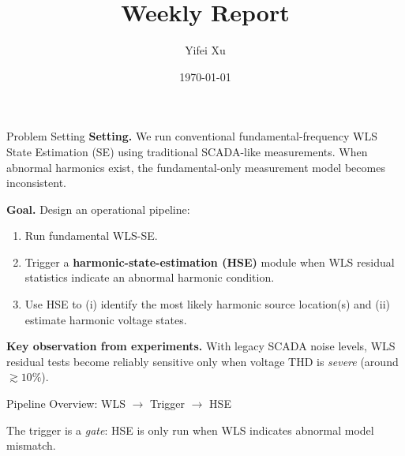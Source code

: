 \documentclass[aspectratio=169]{beamer}
\title[Power System LLM]{Weekly Report}
\author{Yifei Xu}
\institute{New York University}
\date{\today}
\begin{document}
\maketitle
\begin{frame}{Problem Setting}
\textbf{Setting.} We run conventional fundamental-frequency WLS State Estimation (SE) using traditional SCADA-like measurements.
When abnormal harmonics exist, the fundamental-only measurement model becomes inconsistent.

\vspace{0.5em}
\textbf{Goal.} Design an operational pipeline:
\begin{enumerate}
  \item Run fundamental WLS-SE.
  \item Trigger a \textbf{harmonic-state-estimation (HSE)} module when WLS residual statistics indicate an abnormal harmonic condition.
  \item Use HSE to (i) identify the most likely harmonic source location(s) and (ii) estimate harmonic voltage states.
\end{enumerate}

\vspace{0.6em}
\textbf{Key observation from experiments.} With legacy SCADA noise levels, WLS residual tests become reliably sensitive only when voltage THD is \emph{severe} (around $\gtrsim 10\%$).
\end{frame}

\begin{frame}{Pipeline Overview: WLS $\rightarrow$ Trigger $\rightarrow$ HSE}
\begin{center}
\end{center}

\vspace{0.2em}
\small
The trigger is a \emph{gate}: HSE is only run when WLS indicates abnormal model mismatch.
\end{frame}
\end{document}
